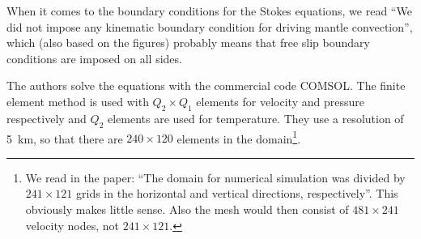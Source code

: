 When it comes to the boundary conditions for the Stokes equations, 
we read ``We did not impose any kinematic boundary condition for driving 
mantle convection'', which (also based on the figures) probably means 
that free slip boundary conditions are imposed on all sides.

The authors solve the equations with the commercial code COMSOL.
The finite element method is used with $Q_2\times Q_1$ elements for velocity and
pressure respectively and $Q_2$ elements are used for temperature.
They use a resolution of 5~\si{\km}, so that there are $240\times 120$ 
elements in the domain\footnote{We read in the paper: ``The domain for 
numerical simulation was divided by $241\times 121$ grids in the 
horizontal and vertical directions, respectively''.
This obviously makes little sense. Also the mesh would then consist of 
$481\times 241$ velocity nodes, not $241\times 121$.}.

\vspace{1cm}

